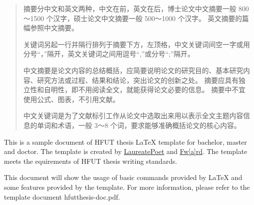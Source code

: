 

\begin{abstract}
  摘要分中文和英文两种，中文在前，英文在后，博士论文中文摘要一般 800～1500 个汉字，硕士论文中文摘要一般 500～1000 个汉字。
  英文摘要的篇幅参照中文摘要。

  关键词另起一行并隔行排列于摘要下方，左顶格，中文关键词间空一字或用分号“，”隔开，英文关键词之间用逗号“,”或分号“;”隔开。

  中文摘要是论文内容的总结概括，应简要说明论文的研究目的、基本研究内容、研究方法或过程、结果和结论，突出论文的创新之处。
  摘要应具有独立性和自明性，即不用阅读全文，就能获得论文必要的信息。
  摘要中不宜使用公式、图表，不引用文献。

  中文关键词是为了文献标引工作从论文中选取出来用以表示全文主题内容信息的单词和术语，一般 3～8 个词，要求能够准确概括论文的核心内容。
\end{abstract}

\begin{abstract*}
  This is a sample document of HFUT thesis \LaTeX{} template for bachelor,
  master and doctor. The template is created by \href{https://github.com/LaureatePoet}{LaureatePoet} and \href{https://github.com/HowardZorn}{Fw[a]rd}. The 
  template meets the equirements of HFUT thesis writing standards.

  This document will show the usage of basic commands provided by \LaTeX{} and
  some features provided by the template. For more information, please refer to
  the template document hfutthesis-doc.pdf.
\end{abstract*}
